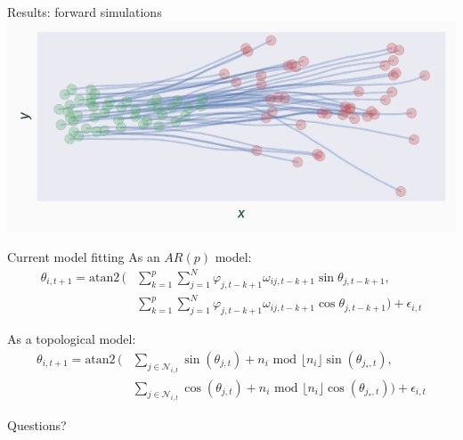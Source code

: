 \documentclass[12pt]{beamer}
\begin{document}
\begin{frame}{Results: forward simulations}
  \vspace{0.85cm}
  \centering
  \includegraphics{forward_sim.pdf}
\end{frame}

\begin{frame}{Current model fitting}
  As an $AR(p)$ model:
  \begin{align*}
    \theta_{i, t+1} = \text{atan2}\,\Bigg(
     & \sum_{k=1}^p \sum_{j=1}^N \varphi_{j, t-k+1} \omega_{ij, t-k+1} \sin \theta_{j, t-k+1}, \\
     & \sum_{k=1}^p \sum_{j=1}^N \varphi_{j, t-k+1} \omega_{ij, t-k+1} \cos \theta_{j, t-k+1}
    \Bigg) + \epsilon_{i, t}
  \end{align*}

  As a topological model:
  \begin{align*}
    \theta_{i,t+1} = \text{atan2}\,\Bigg(
     & \sum_{j\in\mathcal{N}_{i,t}} \sin(\theta_{j,t})
    + n_i \text{ mod } \lfloor n_i\rfloor \sin(\theta_{j_*, t}), \\
     & \sum_{j\in\mathcal{N}_{i,t}} \cos(\theta_{j,t})
    + n_i \text{ mod } \lfloor n_i\rfloor \cos(\theta_{j_*, t}) \Bigg) + \epsilon_{i, t}
  \end{align*}
\end{frame}

\begin{frame}[standout]
  Questions?
\end{frame}

\appendix
\end{document}
